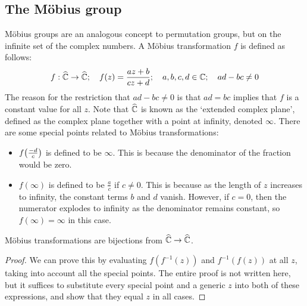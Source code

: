 \subsection{The M\"obius group}
M\"obius groups are an analogous concept to permutation groups, but on the infinite set of the complex numbers.
A M\"obius transformation \(f\) is defined as follows:
\[
	f: \widehat{\mathbb C} \to \widehat{\mathbb C};\quad f(z) = \frac{az + b}{cz + d};\quad a, b, c, d \in \mathbb C;\quad ad-bc \neq 0
\]
The reason for the restriction that \(ad-bc\neq 0\) is that \(ad=bc\) implies that \(f\) is a constant value for all \(z\).
Note that \(\widehat{\mathbb C}\) is known as the `extended complex plane', defined as the complex plane together with a point at infinity, denoted \(\infty\).
There are some special points related to M\"obius transformations:
\begin{itemize}
	\item \(f\qty(\frac{-d}{c})\) is defined to be \(\infty\).
	      This is because the denominator of the fraction would be zero.
	\item \(f(\infty)\) is defined to be \(\frac{a}{c}\) if \(c \neq 0\).
	      This is because as the length of \(z\) increases to infinity, the constant terms \(b\) and \(d\) vanish.
	      However, if \(c = 0\), then the numerator explodes to infinity as the denominator remains constant, so \(f(\infty) = \infty\) in this case.
\end{itemize}

\begin{lemma}
	M\"obius transformations are bijections from \(\widehat{\mathbb C} \to \widehat{\mathbb C}\).
\end{lemma}
\begin{proof}
	We can prove this by evaluating \(f(f^{-1}(z))\) and \(f^{-1}(f(z))\) at all \(z\), taking into account all the special points.
	The entire proof is not written here, but it suffices to substitute every special point and a generic \(z\) into both of these expressions, and show that they equal \(z\) in all cases.
\end{proof}

